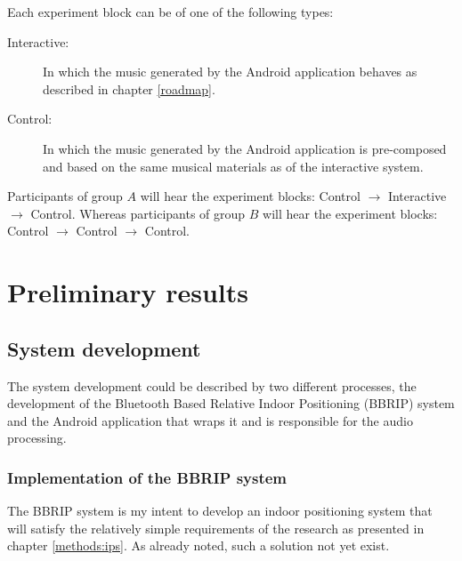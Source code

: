 \documentclass[a4paper,11pt]{article}
\begin{document}
Each experiment block can be of one of the following types:
\begin{description}
	\item[Interactive:] In which the music generated by the Android application behaves as described in chapter \ref{roadmap}.
	\item[Control:] In which the music generated by the Android application is pre-composed and based on the same musical materials as of the interactive system.
\end{description}

Participants of group $A$ will hear the experiment blocks: Control $\rightarrow$ Interactive $\rightarrow$ Control. Whereas participants of group $B$ will hear the experiment blocks: Control $\rightarrow$ Control $\rightarrow$ Control.

\section{Preliminary results}

\subsection{System development}

The system development could be described by two different processes, the development of the Bluetooth Based Relative Indoor Positioning (BBRIP) system and the Android application that wraps it and is responsible for the audio processing.

\subsubsection{Implementation of the BBRIP system}

The BBRIP system is my intent to develop an indoor positioning system that will satisfy the relatively simple requirements of the research as presented in chapter \ref{methods:ips}.
As already noted, such a solution not yet exist.
\end{document}
